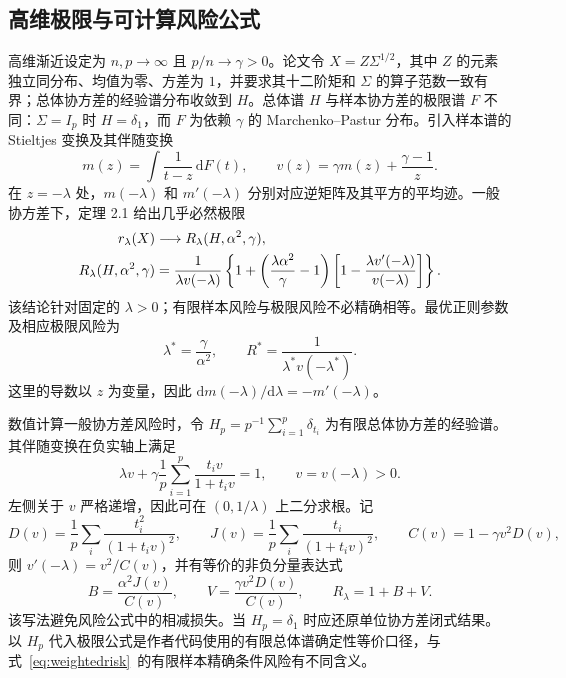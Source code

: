 \documentclass[UTF8,fontset=fandol,a4paper,zihao=-4]{ctexart}
\begin{document}
\subsection{高维极限与可计算风险公式}
高维渐近设定为 $n,p\to\infty$ 且 $p/n\to\gamma>0$。论文令 $X=Z\Sigma^{1/2}$，其中 $Z$ 的元素独立同分布、均值为零、方差为 $1$，并要求其十二阶矩和 $\Sigma$ 的算子范数一致有界；总体协方差的经验谱分布收敛到 $H$\cite[定理 2.1]{dw}。总体谱 $H$ 与样本协方差的极限谱 $F$ 不同：$\Sigma=I_p$ 时 $H=\delta_1$，而 $F$ 为依赖 $\gamma$ 的 Marchenko--Pastur 分布。引入样本谱的 Stieltjes 变换及其伴随变换
\begin{equation}\label{eq:stieltjes}
 m(z)=\int\frac{1}{t-z}\,\mathrm dF(t),\qquad
 v(z)=\gamma m(z)+\frac{\gamma-1}{z}.
\end{equation}
在 $z=-\lambda$ 处，$m(-\lambda)$ 和 $m'(-\lambda)$ 分别对应逆矩阵及其平方的平均迹。一般协方差下，定理 2.1 给出几乎必然极限
\begin{align}
 r_\lambda(X)&\longrightarrow R_\lambda(H,\alpha^2,\gamma),\notag\\
 R_\lambda(H,\alpha^2,\gamma)&=\frac{1}{\lambda v(-\lambda)}
 \left\{1+\left(\frac{\lambda\alpha^2}{\gamma}-1\right)
 \left[1-\frac{\lambda v'(-\lambda)}{v(-\lambda)}\right]\right\}.
 \label{eq:generalrisk}
\end{align}
该结论针对固定的 $\lambda>0$；有限样本风险与极限风险不必精确相等。最优正则参数及相应极限风险为
\begin{equation}\label{eq:optimalgeneral}
 \lambda^*=\frac{\gamma}{\alpha^2},\qquad
 R^*=\frac{1}{\lambda^*v(-\lambda^*)}.
\end{equation}
这里的导数以 $z$ 为变量，因此 $\mathrm d m(-\lambda)/\mathrm d\lambda=-m'(-\lambda)$。

数值计算一般协方差风险时，令 $H_p=p^{-1}\sum_{i=1}^{p}\delta_{t_i}$ 为有限总体协方差的经验谱。其伴随变换在负实轴上满足
\begin{equation}\label{eq:companion_solver}
 \lambda v+\gamma\frac{1}{p}\sum_{i=1}^{p}\frac{t_i v}{1+t_i v}=1,
 \qquad v=v(-\lambda)>0.
\end{equation}
左侧关于 $v$ 严格递增，因此可在 $(0,1/\lambda)$ 上二分求根。记
\begin{equation}
 D(v)=\frac{1}{p}\sum_i\frac{t_i^2}{(1+t_i v)^2},\qquad
 J(v)=\frac{1}{p}\sum_i\frac{t_i}{(1+t_i v)^2},\qquad C(v)=1-\gamma v^2D(v),
\end{equation}
则 $v'(-\lambda)=v^2/C(v)$，并有等价的非负分量表达式
\begin{equation}\label{eq:generalcomponents}
 B=\frac{\alpha^2J(v)}{C(v)},\qquad
 V=\frac{\gamma v^2D(v)}{C(v)},\qquad R_\lambda=1+B+V.
\end{equation}
该写法避免风险公式中的相减损失。当 $H_p=\delta_1$ 时应还原单位协方差闭式结果。以 $H_p$ 代入极限公式是作者代码使用的有限总体谱确定性等价口径\cite{authorcode}，与式~\eqref{eq:weightedrisk}~的有限样本精确条件风险有不同含义。
\end{document}
